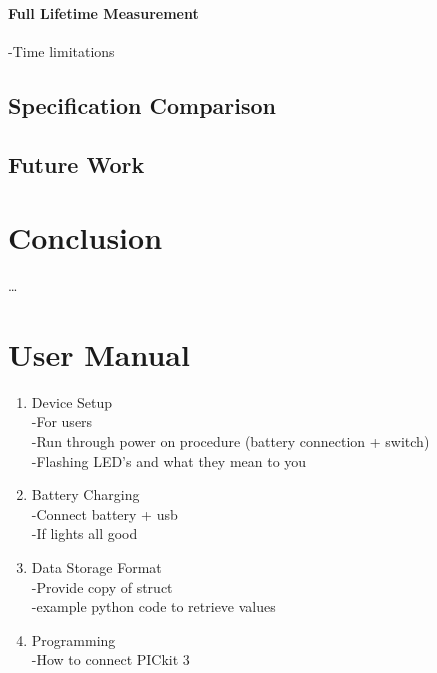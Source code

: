 \documentclass[12pt,openany,a4paper]{book}
\begin{document}
	\subsubsection{Full Lifetime Measurement}
		-Time limitations\\
	
	\section{Specification Comparison}
	\section{Future Work} \label{sec:FUTURE}

\chapter{Conclusion}

\ldots 

\chapter{User Manual}

\begin{enumerate}
	\item Device Setup\\
		-For users\\
		-Run through power on procedure (battery connection + switch)\\
		-Flashing LED's and what they mean to you \\
	\item Battery Charging\\
		-Connect battery + usb \\
		-If lights all good \\
	\item Data Storage Format \\
		-Provide copy of struct \\
		-example python code to retrieve values\\
	\item Programming \\
		-How to connect PICkit 3
		
\end{enumerate}


\appendix

\end{document}
